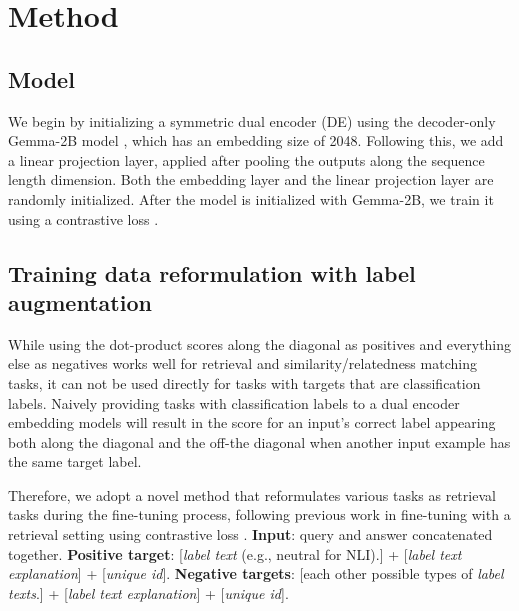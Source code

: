 
\section{Method}

\subsection{Model}
We begin by initializing a symmetric dual encoder (DE) using the decoder-only Gemma-2B model \citep{gemmateam2024gemmaopenmodelsbased, palma-gomez-etal-2024-transforming}, which has an embedding size of 2048. Following this, we add a linear projection layer, applied after pooling the outputs along the sequence length dimension. Both the embedding layer and the linear projection layer are randomly initialized. After the model is initialized with Gemma-2B, we train it using a contrastive loss \citep{Hadsell2006DimensionalityRB}. 

\subsection{Training data reformulation with label augmentation}
While using the dot-product scores along the diagonal as positives and everything else as negatives works well for retrieval and similarity/relatedness matching tasks, it can not be used directly for tasks with targets that are classification labels. Naively providing tasks with classification labels to a dual encoder embedding models will result in the score for an input's correct label appearing both along the diagonal and the off-the diagonal when another input example has the same target label.

Therefore, we adopt a novel method that reformulates various tasks as retrieval tasks during the fine-tuning process, following previous work in fine-tuning with a retrieval setting using contrastive loss \citep{lee2024geckoversatiletextembeddings, meng2024sfrembedding}. \textbf{Input}: query and answer concatenated together. \textbf{Positive target}: [\textit{label text} (e.g., neutral for NLI).] + [\textit{label text explanation}] + [\textit{unique id}]. \textbf{Negative targets}: [each other possible types of \textit{label texts}.] + [\textit{label text explanation}] + [\textit{unique id}]. 

